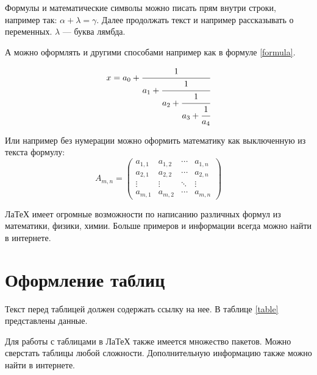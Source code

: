 \documentclass[a4paper, 14pt]{extarticle}
\begin{document}
Формулы и математические символы можно писать прям внутри строки, например так: $ \alpha+\lambda=\gamma$. Далее продолжать текст и например рассказывать о переменных. $\lambda$ --- буква лямбда.

А можно оформлять и другими способами например как в формуле \eqref{formula}.

\begin{equation}\label{formula}
	x = a_0 + \cfrac{1}{a_1 
		+ \cfrac{1}{a_2 
			+ \cfrac{1}{a_3 + \cfrac{1}{a_4} } } }
\end{equation}

Или например без нумерации можно оформить математику как выключенную из текста формулу:
\[ A_{m,n} = 
\begin{pmatrix}
	a_{1,1} & a_{1,2} & \cdots & a_{1,n} \\
	a_{2,1} & a_{2,2} & \cdots & a_{2,n} \\
	\vdots  & \vdots  & \ddots & \vdots  \\
	a_{m,1} & a_{m,2} & \cdots & a_{m,n} 
\end{pmatrix} \]

ЛаТеХ имеет огромные возможности по написанию различных формул из математики, физики, химии. Больше примеров и информации всегда можно найти в интернете.


\clearpage
\section{Оформление таблиц}

Текст перед таблицей должен содержать ссылку на нее. В таблице \ref{table} представлены данные.

\begin{table}[h]
\caption{Название таблицы}\label{table}
\end{table}

Для работы с таблицами в ЛаТеХ также имеется множество пакетов. Можно сверстать таблицы любой сложности. Дополнительную информацию также можно найти в интернете.
\end{document}
